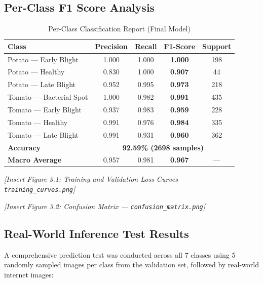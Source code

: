 \documentclass[12pt,a4paper]{report}
\begin{document}
\subsection{Per-Class F1 Score Analysis}

\begin{table}[H]
\centering
\caption{Per-Class Classification Report (Final Model)}
\label{tab:f1}
\begin{tabular}{lcccc}
\toprule
\textbf{Class} & \textbf{Precision} & \textbf{Recall} & \textbf{F1-Score} & \textbf{Support} \\
\midrule
Potato — Early Blight    & 1.000 & 1.000 & \textbf{1.000} & 198 \\
Potato — Healthy         & 0.830 & 1.000 & \textbf{0.907} & 44  \\
Potato — Late Blight     & 0.952 & 0.995 & \textbf{0.973} & 218 \\
Tomato — Bacterial Spot  & 1.000 & 0.982 & \textbf{0.991} & 435 \\
Tomato — Early Blight    & 0.937 & 0.983 & \textbf{0.959} & 228 \\
Tomato — Healthy         & 0.991 & 0.976 & \textbf{0.984} & 335 \\
Tomato — Late Blight     & 0.991 & 0.931 & \textbf{0.960} & 362 \\
\midrule
\textbf{Accuracy}        & \multicolumn{4}{c}{\textbf{92.59\% (2698 samples)}} \\
\textbf{Macro Average}   & 0.957 & 0.981 & \textbf{0.967} & --- \\
\bottomrule
\end{tabular}
\end{table}

\textit{[Insert Figure 3.1: Training and Validation Loss Curves — \texttt{training\_curves.png}]}

\textit{[Insert Figure 3.2: Confusion Matrix — \texttt{confusion\_matrix.png}]}

\subsection{Real-World Inference Test Results}
A comprehensive prediction test was conducted across all 7 classes using 5 randomly sampled images per class from the validation set, followed by real-world internet images:
\end{document}
